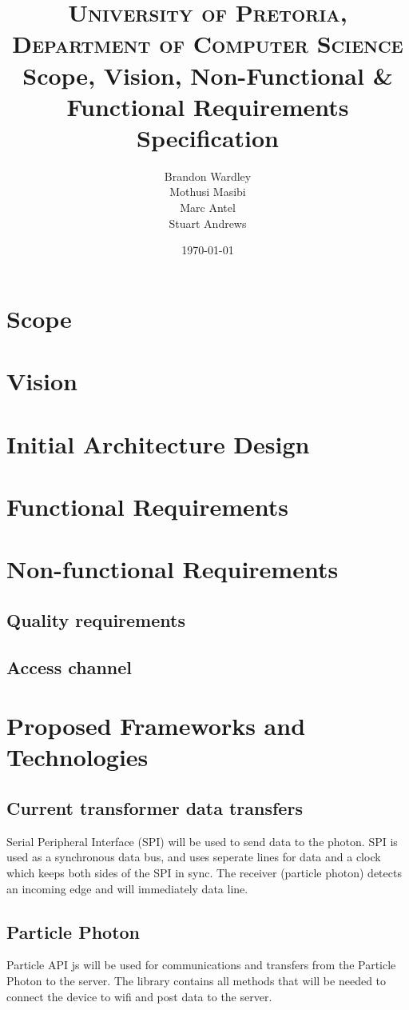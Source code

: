 \documentclass[paper=a4, fontsize=11pt]{scrartcl} %
\title {
	\normalfont \normalsize 
	\textsc{University of Pretoria, Department of Computer Science} \\ [25pt]
	\huge Scope, Vision, Non-Functional \& Functional Requirements Specification\\
}
\author {
	Brandon Wardley  \\
	Mothusi Masibi \\
	Marc Antel \\
	Stuart Andrews \\
}
\date{\normalsize\today} %
\begin{document}
	\maketitle %
	\newpage
	\section{Scope}
	\newpage
	\section{Vision}
	\newpage
	\section{Initial Architecture Design}
	\newpage
	\section{Functional Requirements}
	\newpage
	\section{Non-functional Requirements}
	\subsection{Quality requirements}
	\paragraph{}
	\subsection{Access channel}
	\newpage
	\section{Proposed Frameworks and Technologies}
	\subsection{Current transformer data transfers}
	Serial Peripheral Interface (SPI) will be used to send data to the photon. SPI is used as a synchronous data bus,
	and uses seperate lines for data and a clock which keeps both sides of the SPI in sync. The receiver (particle photon) detects an incoming 
	edge and will immediately data line. 
	\subsection{Particle Photon}
	Particle API js will be used for communications and transfers from the Particle Photon to the server. The library contains all
	methods that will be needed to connect the device to wifi and post data to the server.
	
\end{document}
